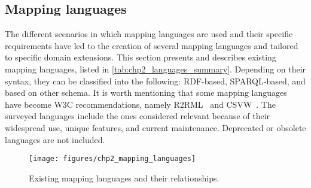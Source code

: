 \subsection{Mapping languages}
The different scenarios in which mapping languages are used and their specific requirements have led to the creation of several mapping languages and tailored to specific domain extensions. This section presents and describes existing mapping languages, listed in \cref{tab:chp2_languages_summary}. Depending on their syntax, they can be classified into the following: RDF-based, SPARQL-based, and based on other schema. It is worth mentioning that some mapping languages have become W3C recommendations, namely R2RML~\citep{das2012r2rml} and CSVW~\citep{Tennison2015csvw}. The surveyed languages include the ones considered relevant because of their widespread use, unique features, and current maintenance. Deprecated or obsolete languages are not included.

\begin{figure*}[h]
\centering
\texttt{[image: figures/chp2\_mapping\_languages]}
\caption[Mapping laguages overview]{Existing mapping languages and their relationships.}
\label{fig:chp2_mapping_languages}
\end{figure*}

